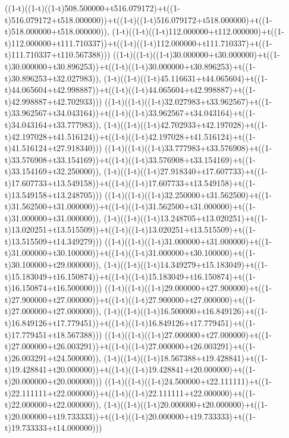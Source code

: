 ((1-t)((1-t)((1-t)508.500000+t516.079172)+t((1-t)516.079172+t518.000000))+t((1-t)((1-t)516.079172+t518.000000)+t((1-t)518.000000+t518.000000)),                                     (1-t)((1-t)((1-t)112.000000+t112.000000)+t((1-t)112.000000+t111.710337))+t((1-t)((1-t)112.000000+t111.710337)+t((1-t)111.710337+t110.567388)))
((1-t)((1-t)((1-t)30.000000+t30.000000)+t((1-t)30.000000+t30.896253))+t((1-t)((1-t)30.000000+t30.896253)+t((1-t)30.896253+t32.027983)),                                     (1-t)((1-t)((1-t)45.116631+t44.065604)+t((1-t)44.065604+t42.998887))+t((1-t)((1-t)44.065604+t42.998887)+t((1-t)42.998887+t42.702933)))
((1-t)((1-t)((1-t)32.027983+t33.962567)+t((1-t)33.962567+t34.043164))+t((1-t)((1-t)33.962567+t34.043164)+t((1-t)34.043164+t33.777983)),                                     (1-t)((1-t)((1-t)42.702933+t42.197028)+t((1-t)42.197028+t41.516124))+t((1-t)((1-t)42.197028+t41.516124)+t((1-t)41.516124+t27.918340)))
((1-t)((1-t)((1-t)33.777983+t33.576908)+t((1-t)33.576908+t33.154169))+t((1-t)((1-t)33.576908+t33.154169)+t((1-t)33.154169+t32.250000)),                                     (1-t)((1-t)((1-t)27.918340+t17.607733)+t((1-t)17.607733+t13.549158))+t((1-t)((1-t)17.607733+t13.549158)+t((1-t)13.549158+t13.248705)))
((1-t)((1-t)((1-t)32.250000+t31.562500)+t((1-t)31.562500+t31.000000))+t((1-t)((1-t)31.562500+t31.000000)+t((1-t)31.000000+t31.000000)),                                     (1-t)((1-t)((1-t)13.248705+t13.020251)+t((1-t)13.020251+t13.515509))+t((1-t)((1-t)13.020251+t13.515509)+t((1-t)13.515509+t14.349279)))
((1-t)((1-t)((1-t)31.000000+t31.000000)+t((1-t)31.000000+t30.100000))+t((1-t)((1-t)31.000000+t30.100000)+t((1-t)30.100000+t29.000000)),                                     (1-t)((1-t)((1-t)14.349279+t15.183049)+t((1-t)15.183049+t16.150874))+t((1-t)((1-t)15.183049+t16.150874)+t((1-t)16.150874+t16.500000)))
((1-t)((1-t)((1-t)29.000000+t27.900000)+t((1-t)27.900000+t27.000000))+t((1-t)((1-t)27.900000+t27.000000)+t((1-t)27.000000+t27.000000)),                                     (1-t)((1-t)((1-t)16.500000+t16.849126)+t((1-t)16.849126+t17.779451))+t((1-t)((1-t)16.849126+t17.779451)+t((1-t)17.779451+t18.567388)))
((1-t)((1-t)((1-t)27.000000+t27.000000)+t((1-t)27.000000+t26.003291))+t((1-t)((1-t)27.000000+t26.003291)+t((1-t)26.003291+t24.500000)),                                     (1-t)((1-t)((1-t)18.567388+t19.428841)+t((1-t)19.428841+t20.000000))+t((1-t)((1-t)19.428841+t20.000000)+t((1-t)20.000000+t20.000000)))
((1-t)((1-t)((1-t)24.500000+t22.111111)+t((1-t)22.111111+t22.000000))+t((1-t)((1-t)22.111111+t22.000000)+t((1-t)22.000000+t22.000000)),                                     (1-t)((1-t)((1-t)20.000000+t20.000000)+t((1-t)20.000000+t19.733333))+t((1-t)((1-t)20.000000+t19.733333)+t((1-t)19.733333+t14.000000)))
